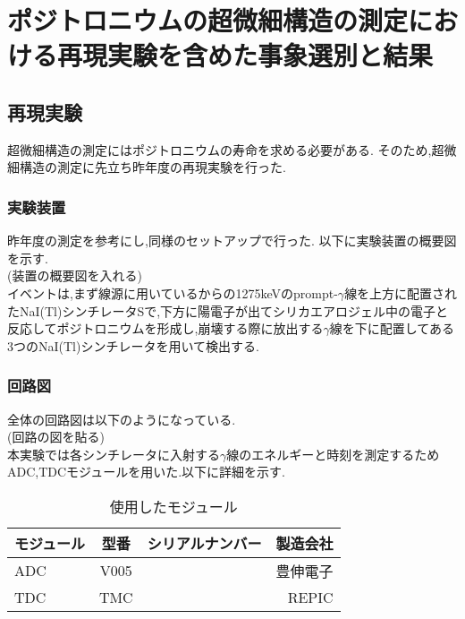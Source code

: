 \chapter{ポジトロニウムの超微細構造の測定における再現実験を含めた事象選別と結果}\label{result}

\section{再現実験}
超微細構造の測定にはポジトロニウムの寿命を求める必要がある.
そのため,超微細構造の測定に先立ち昨年度の再現実験を行った.

\subsection{実験装置}
昨年度の測定を参考にし,同様のセットアップで行った.
以下に実験装置の概要図を示す.\\
(装置の概要図を入れる)\\

イベントは,まず線源に用いているからの1275keVのprompt-$\gamma$線を上方に配置されたNaI(Tl)シンチレータSで,下方に陽電子が出てシリカエアロジェル中の電子と反応してポジトロニウムを形成し,崩壊する際に放出する$\gamma$線を下に配置してある3つのNaI(Tl)シンチレータを用いて検出する.

\subsection{回路図}
全体の回路図は以下のようになっている.\\
(回路の図を貼る)\\

本実験では各シンチレータに入射する$\gamma$線のエネルギーと時刻を測定するためADC,TDCモジュールを用いた.以下に詳細を示す.
\begin{table}[htb]
	\begin{center}
		\caption{使用したモジュール}
		\begin{tabular}{|l|c|r|r|} \hline
			モジュール & 型番 & シリアルナンバー & 製造会社 \\ \hline \hline
			ADC & V005 & & 豊伸電子 \\ \hline
			TDC & TMC & & REPIC \\ \hline
		\end{tabular}
		\label{module}
	\end{center}
\end{table}

